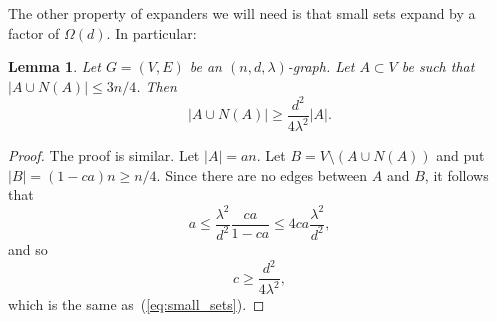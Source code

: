 \documentclass[11pt]{article}
\numberwithin{equation}{section}
\newtheorem{lemma}[theorem]{Lemma}
\theoremstyle{definition}
\theoremstyle{plain}
\begin{document}
The other property of expanders we will need is that small sets expand by a factor of 
$\Omega(d)$. In particular:

\begin{lemma} \label{lem:small_sets} 
Let $G=(V,E)$ be an $(n,d,\lambda)$-graph. 
Let $A \subset V$ be such that $|A \cup N(A)| \leq 3n/4$.
Then 
\begin{equation} \label{eq:small_sets}
| A \cup N(A)| \geq \frac{d^2}{4 \lambda^2} |A|.
\end{equation}
\end{lemma} 

\begin{proof}
The proof is similar. Let $|A| = a n$. 
Let $B = V \setminus (A \cup N(A))$ and put 
$|B| = (1- c a) n \geq n/4$. Since there are no edges between $A$ and $B$, 
it follows that 
\[
a \leq \frac{\lambda^2}{d^2}  \frac{c a}{1 - c a} \leq 4 c a \frac{\lambda^2}{d^2},
\]
and so 
\[
c \geq  \frac{d^2}{4 \lambda^2},
\]
which is the same as~(\ref{eq:small_sets}).
\end{proof}
 



%
%
%
%
%
%
%
%
%
%
%
%
%
%
%
\end{document}
